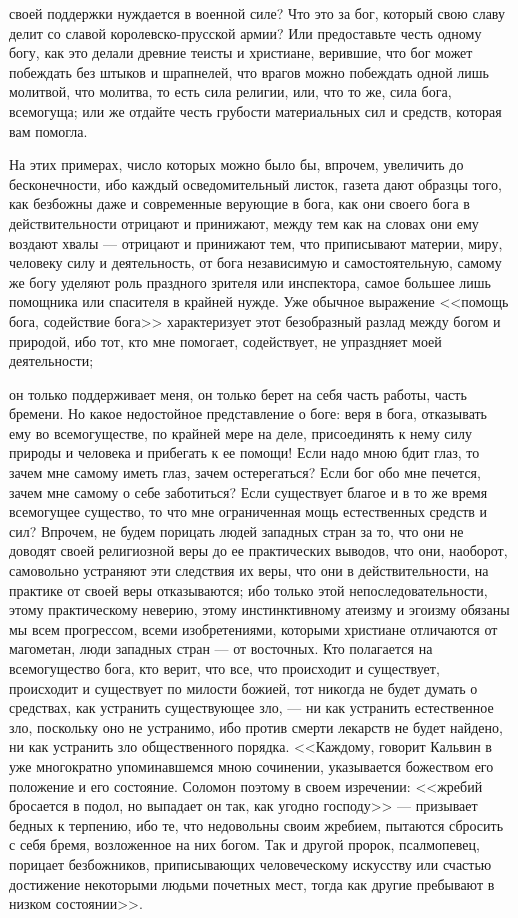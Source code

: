 \documentclass[12pt]{article}
\begin{document}
своей поддержки нуждается в военной силе? Что это за бог, который свою славу делит со славой королевско-прусской армии? Или предоставьте честь одному богу, как это делали древние теисты и христиане, верившие, что бог может побеждать без штыков и шрапнелей, что врагов можно побеждать одной лишь молитвой, что молитва, то есть сила религии, или, что то же, сила бога, всемогуща; или же отдайте честь грубости материальных сил и средств, которая вам помогла. 

На этих примерах, число которых можно было бы, впрочем, увеличить до бесконечности, ибо каждый осведомительный листок, газета дают образцы того, как безбожны даже и современные верующие в бога, как они своего бога в действительности отрицают и принижают, между тем как на словах они ему воздают хвалы --- отрицают и принижают тем, что приписывают материи, миру, человеку силу и деятельность, от бога независимую и самостоятельную, самому же богу уделяют роль праздного зрителя или инспектора, самое большее лишь помощника или спасителя в крайней нужде. Уже обычное выражение <<помощь бога, содействие бога>> характеризует этот безобразный разлад между богом и природой, ибо тот, кто мне помогает, содействует, не упраздняет моей деятельности; 

он только поддерживает меня, он только берет на себя часть работы, часть бремени. Но какое недостойное представление о боге: веря в бога, отказывать ему во всемогуществе, по крайней мере на деле, присоединять к нему силу природы и человека и прибегать к ее помощи! Если надо мною бдит глаз, то зачем мне самому иметь глаз, зачем остерегаться? Если бог обо мне печется, зачем мне самому о себе заботиться? Если существует благое и в то же время всемогущее существо, то что мне ограниченная мощь естественных средств и сил? Впрочем, не будем порицать людей западных стран за то, что они не доводят своей религиозной веры до ее практических выводов, что они, наоборот, самовольно устраняют эти следствия их веры, что они в действительности, на практике от своей веры отказываются; ибо только этой непоследовательности, этому практическому неверию, этому инстинктивному атеизму и эгоизму обязаны мы всем прогрессом, всеми изобретениями, которыми христиане отличаются от магометан, люди западных стран --- от восточных. Кто полагается на всемогущество бога, кто верит, что все, что происходит и существует, происходит и существует по милости божией, тот никогда не будет думать о средствах, как устранить существующее зло, --- ни как устранить естественное зло, поскольку оно не устранимо, ибо против смерти лекарств не будет найдено, ни как устранить зло общественного порядка. <<Каждому, говорит Кальвин в уже многократно упоминавшемся мною сочинении, указывается божеством его положение и его состояние. Соломон поэтому в своем изречении: <<жребий бросается в подол, но выпадает он так, как угодно господу>> --- призывает бедных к терпению, ибо те, что недовольны своим жребием, пытаются сбросить с себя бремя, возложенное на них богом. Так и другой пророк, псалмопевец, порицает безбожников, приписывающих человеческому искусству или счастью достижение некоторыми людьми почетных мест, тогда как другие пребывают в низком состоянии>>. 
\end{document}
